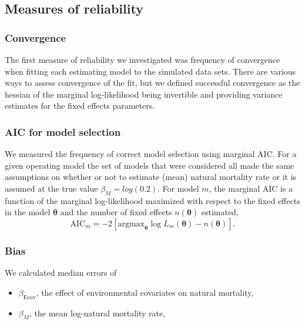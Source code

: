 \documentclass[
  12pt,
]{article}
\begin{document}
\hypertarget{measures-of-reliability}{%
\subsection*{Measures of reliability}\label{measures-of-reliability}}

\hypertarget{convergence}{%
\subsubsection*{Convergence}\label{convergence}}

The first measure of reliability we investigated was frequency of convergence when fitting each estimating model to the simulated data sets. There are various ways to assess convergence of the fit, but we defined successful convergence as the hessian of the marginal log-likelihood being invertible and providing variance estimates for the fixed effects parameters.

\hypertarget{aic-for-model-selection}{%
\subsubsection*{AIC for model selection}\label{aic-for-model-selection}}

We measured the frequency of correct model selection using marginal AIC. For a given operating model the set of models that were considered all made the same assumptions on whether or not to estimate (mean) natural mortality rate or it is assumed at the true value \(\beta_M = log(0.2)\). For model \(m\), the marginal AIC is a function of the marginal log-likelihood maximized with respect to the fixed effects in the model \(\boldsymbol{\theta}\) and the number of fixed effects \(n\left(\boldsymbol{\theta}\right)\) estimated,
\[
\text{AIC}_m = -2\left[{\text{argmax}}_{\boldsymbol{\theta}} \log L_m\left({\boldsymbol{\theta}}\right) - n\left({\boldsymbol{\theta}}\right)\right].
\]

\hypertarget{bias}{%
\subsubsection*{Bias}\label{bias}}

We calculated median errors of

\begin{itemize}
\item $\beta_\text{Ecov}$, the effect of environmental covariates on natural mortality, 
\item $\beta_M$, the mean log-natural mortality rate,
\end{itemize}
\end{document}
